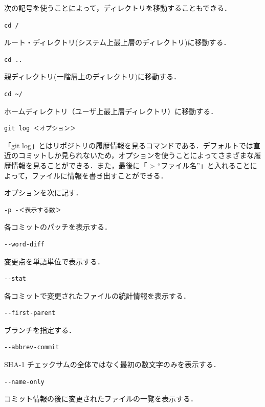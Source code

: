 次の記号を使うことによって，ディレクトリを移動することもできる．

{
\small
\begin{verbatim}
cd /
\end{verbatim}
}
ルート・ディレクトリ(システム上最上層のディレクトリ)に移動する．

{
\small
\begin{verbatim}
cd ..
\end{verbatim}
}
親ディレクトリ(一階層上のディレクトリ)に移動する．

{
\small
\begin{verbatim}
cd ~/
\end{verbatim}
}
ホームディレクトリ（ユーザ上最上層ディレクトリ）に移動する．

\hfil
\begin{lstlisting}[basicstyle=\ttfamily\footnotesize, frame=single]
git log ＜オプション＞
\end{lstlisting}
「git log」とはリポジトリの履歴情報を見るコマンドである．デフォルトでは直近のコミットしか見られないため，オプションを使うことによってさまざまな履歴情報を見ることができる．また，最後に「 > “ファイル名”」と入れることによって，ファイルに情報を書き出すことができる．

オプションを次に記す．

{
\small
\begin{verbatim}
-p -＜表示する数＞
\end{verbatim}
}
各コミットのパッチを表示する．

{
\small
\begin{verbatim}
--word-diff
\end{verbatim}
}
変更点を単語単位で表示する．

{
\small
\begin{verbatim}
--stat
\end{verbatim}
}
各コミットで変更されたファイルの統計情報を表示する．

{
\small
\begin{verbatim}
--first-parent
\end{verbatim}
}
ブランチを指定する．

{
\small
\begin{verbatim}
--abbrev-commit
\end{verbatim}
}
SHA-1 チェックサムの全体ではなく最初の数文字のみを表示する．

{
\small
\begin{verbatim}
--name-only
\end{verbatim}
}
コミット情報の後に変更されたファイルの一覧を表示する．

